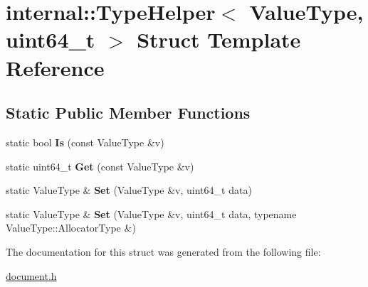 \hypertarget{a02044}{}\section{internal\+:\+:Type\+Helper$<$ Value\+Type, uint64\+\_\+t $>$ Struct Template Reference}
\label{a02044}
\subsection*{Static Public Member Functions}
\begin{DoxyCompactItemize}
\item 
\mbox{\label{a02044_a4916651732ed27fa944c96a32cec5b88}} 
static bool {\bfseries Is} (const Value\+Type \&v)
\item 
\mbox{\label{a02044_a1b1b2e4fe3c38fb37701284c6571ee92}} 
static uint64\+\_\+t {\bfseries Get} (const Value\+Type \&v)
\item 
\mbox{\label{a02044_a38392035fe5a647078b24f0e15a84145}} 
static Value\+Type \& {\bfseries Set} (Value\+Type \&v, uint64\+\_\+t data)
\item 
\mbox{\label{a02044_a3c8b01c3e9a9e63c99bef2db9fdf3823}} 
static Value\+Type \& {\bfseries Set} (Value\+Type \&v, uint64\+\_\+t data, typename Value\+Type\+::\+Allocator\+Type \&)
\end{DoxyCompactItemize}


The documentation for this struct was generated from the following file\+:\begin{DoxyCompactItemize}
\item 
\hyperlink{a00476}{document.\+h}\end{DoxyCompactItemize}
